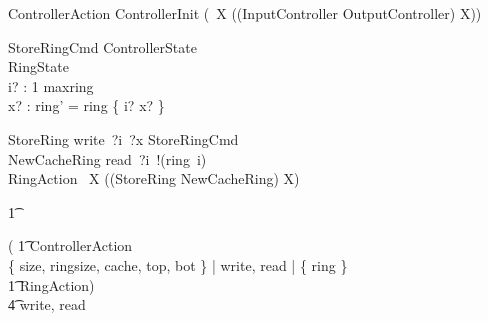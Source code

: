 \documentclass{article}
\begin{document}
\begin{circusaction}
    ControllerAction \circdef \lschexpract ControllerInit \rschexpract \circseq (\circmu\ X \circspot ((InputController \extchoice OutputController) \circseq X)) 
\end{circusaction}


\begin{schema}{StoreRingCmd}
    \Xi ControllerState
    \\%
    \Delta RingState
    \\%
    i? : 1 \upto maxring
    \\%
    x? : \nat
\where
    ring' = ring \oplus \{ i? \mapsto x? \}
\end{schema}

\begin{circusaction}
   StoreRing \circdef write~?i~?x \then \lschexpract StoreRingCmd \rschexpract \\
   NewCacheRing \circdef read~?i~!(ring~i) \then \Skip \\
   RingAction \circdef \circmu\ X \circspot ((StoreRing \extchoice NewCacheRing) \circseq X)
\end{circusaction}

\begin{circusaction}
    \t1 \circspot

   \circblockbegin
   ( \t1 ControllerAction \\ \lpar 
        \{ size, ringsize, cache, top, bot \} |
        \lchanset write, read \rchanset |
        \{ ring \} \rpar \\
     \t1 RingAction)
    \circblockend    \\
     \t4 \circhide \lchanset write, read \rchanset
\end{circusaction}

\begin{circus}
    \circend
\end{circus}

\CircusDeclSummary
\end{document}
